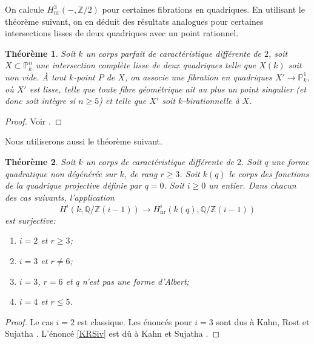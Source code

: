 \documentclass[11pt]{article}
\newenvironment{enumeratei}
{\bgroup\def\theenumi{\roman{enumi}}\def\theenumii{\arabic{enumii}}\begin{enumerate}}
{\end{enumerate}\egroup}
\newtheorem{thm}{Théorème}[section]
\theoremstyle{definition}
\newcommand{\Q}{\mathbb Q}
\newcommand{\Z}{\mathbb Z}
\renewcommand{\P}{\mathbb P}
\newcommand{\on}[1]{\operatorname{#1}}
\begin{document}
On calcule $H^3_{\on{nr}}(-,\Z/2)$ pour certaines fibrations en quadriques. En utilisant le théorème suivant, on en déduit des résultats analogues pour certaines intersections lisses de deux quadriques avec un point rationnel.

\begin{thm}\label{theorem3.2}
Soit $k$ un corps parfait de caractéristique différente de $2$, soit \hbox{$X\subset \P^n_k$} une intersection complète lisse de deux quadriques telle que $X(k)$ soit non vide. À tout $k$-point $P$ de $X$, on associe une fibration en quadriques $X'\to\P^1_k$, où $X'$ est lisse, telle que toute fibre géométrique ait au plus un point singulier (et donc soit intègre si $n\geq 5$) et telle que $X'$ soit $k$-birationnelle à $X$.
\end{thm}

\begin{proof}
Voir \cite[Th.\,3.2, (3.4) p.\,61, Rem.\,1.13.1]{colliot1987intersectionsI}.
\end{proof}

Nous utiliserons aussi le théorème suivant.
\begin{thm}\label{KRS}
Soit $k$ un corps de caractéristique différente de $2$.
Soit $q$ une forme quadratique non dégénérée sur $k$, de rang $r\geq 3$. Soit $k(q)$ le corps des fonctions de la quadrique projective définie par $q=0$.
Soit $i \geq 0$ un entier. Dans chacun des cas suivants, l'application
\[
H^{i}(k,\Q/\Z(i-1)) \to H^{i}_{\on{nr}}(k(q), \Q/\Z(i-1))
\]
est surjective:
\begin{enumeratei}
\item\label{KRSi}
$i=2$ et $r\geq 3$;

\item\label{KRSii}
$i=3$ et $r\neq 6$;

\item\label{KRSiii}
$i=3$, $r=6$ et $q$ n'est pas une forme d'Albert;

\item\label{KRSiv}
$i=4$ et $r\leq 5$.
\end{enumeratei}
\end{thm}

\begin{proof} Le cas $i=2$ est classique. Les énoncés pour $i=3$ sont dus à Kahn, Rost et Sujatha \cite[Th.\,5, Cor.\,10(2)]{kahn1998unramified}. L'énoncé \eqref{KRSiv} est dû à Kahn et Sujatha \cite[Th.\,3]{kahnsuja1998unramified}.
\end{proof}
\end{document}

